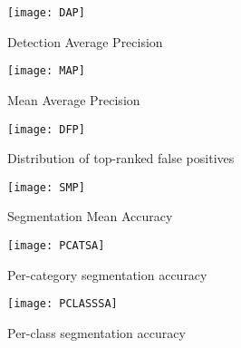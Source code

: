 \begin{figure}
    \texttt{[image: DAP]}
    \caption{Detection Average Precision \textcite{donahue}}
    \label{fig:dap}
\end{figure}

\begin{figure}
    \texttt{[image: MAP]}
    \caption{Mean Average Precision \textcite{donahue}}
    \label{fig:MAP}
\end{figure}

\begin{figure}
    \texttt{[image: DFP]}
    \caption{Distribution of top-ranked false positives
    \textcite{donahue}}
    \label{fig:DFP}
\end{figure}

\begin{figure}
    \texttt{[image: SMP]}
    \caption{Segmentation Mean Accuracy \textcite{donahue}}
    \label{fig:SMP}
\end{figure}

\begin{figure}
    \texttt{[image: PCATSA]}
    \caption{Per-category segmentation accuracy \textcite{donahue}}
    \label{fig:PCATSA}
\end{figure}

\begin{figure}
    \texttt{[image: PCLASSSA]}
    \caption{Per-class segmentation accuracy \textcite{donahue}}
    \label{fig:PCLASSA}
\end{figure}

